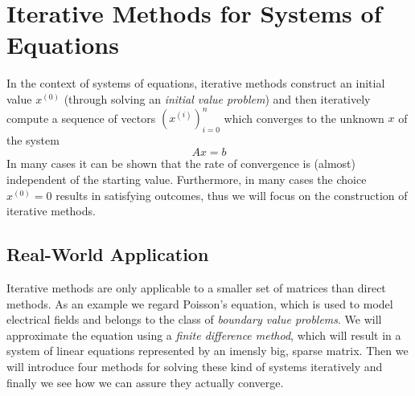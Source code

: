 \section{Iterative Methods for Systems of Equations}
In the context of systems of equations, iterative methods construct an initial value \(x^{(0)}\) (through solving an \emph{initial value problem}) and then iteratively compute a sequence of vectors \((x^{(i)})_{i=0}^n\) which converges to the unknown \(x\) of the system
\[Ax = b\]
In many cases it can be shown that the rate of convergence is (almost) independent of the starting value.
Furthermore, in many cases the choice \(x^{(0)} = 0\) results in satisfying outcomes, thus we will focus on the construction of iterative methods.

\subsection{Real-World Application}
Iterative methods are only applicable to a smaller set of matrices than direct methods.
As an example we regard Poisson's equation, which is used to model electrical fields and belongs to the class of \emph{boundary value problems}.
We will approximate the equation using a \emph{finite difference method}, which will result in a system of linear equations represented by an imensly big, sparse matrix.
Then we will introduce four methods for solving these kind of systems iteratively and finally we see how we can assure they actually converge.

